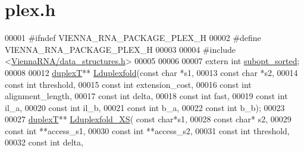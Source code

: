 \hypertarget{plex_8h_source}{}\section{plex.\+h}
\label{plex_8h_source}

\begin{DoxyCode}
00001 \textcolor{preprocessor}{#ifndef VIENNA\_RNA\_PACKAGE\_PLEX\_H}
00002 \textcolor{preprocessor}{#define VIENNA\_RNA\_PACKAGE\_PLEX\_H}
00003 
00004 \textcolor{preprocessor}{#include <\mbox{\hyperlink{data__structures_8h}{ViennaRNA/data\_structures.h}}>}
00005 
00006 
00007 \textcolor{keyword}{extern} \textcolor{keywordtype}{int} \mbox{\hyperlink{plex_8h_a873cf8ed69e0437f8efa8b1fec854a0e}{subopt\_sorted}};
00008 
00012 \mbox{\hyperlink{group__data__structures_structduplex_t}{duplexT}}** \mbox{\hyperlink{plex_8h_adf439821fe8201e071b56b8e12459762}{Lduplexfold}}(\textcolor{keyword}{const} \textcolor{keywordtype}{char} *s1,
00013                       \textcolor{keyword}{const} \textcolor{keywordtype}{char} *s2,
00014                       \textcolor{keyword}{const} \textcolor{keywordtype}{int} threshold,
00015                       \textcolor{keyword}{const} \textcolor{keywordtype}{int} extension\_cost,
00016                       \textcolor{keyword}{const} \textcolor{keywordtype}{int} alignment\_length,
00017                       \textcolor{keyword}{const} \textcolor{keywordtype}{int} delta,
00018                       \textcolor{keyword}{const} \textcolor{keywordtype}{int} fast,
00019                       \textcolor{keyword}{const} \textcolor{keywordtype}{int} il\_a,
00020                       \textcolor{keyword}{const} \textcolor{keywordtype}{int} il\_b,
00021                       \textcolor{keyword}{const} \textcolor{keywordtype}{int} b\_a,
00022                       \textcolor{keyword}{const} \textcolor{keywordtype}{int} b\_b);
00023 
00027 \mbox{\hyperlink{group__data__structures_structduplex_t}{duplexT}}** \mbox{\hyperlink{plex_8h_a7d6b8e940b04cf72a237b88b40a1ec2c}{Lduplexfold\_XS}}( \textcolor{keyword}{const} \textcolor{keywordtype}{char}*s1,
00028                           \textcolor{keyword}{const} \textcolor{keywordtype}{char}* s2,
00029                           \textcolor{keyword}{const} \textcolor{keywordtype}{int} **access\_s1,
00030                           \textcolor{keyword}{const} \textcolor{keywordtype}{int} **access\_s2,
00031                           \textcolor{keyword}{const} \textcolor{keywordtype}{int} threshold,
00032                           \textcolor{keyword}{const} \textcolor{keywordtype}{int} delta,

\end{DoxyCode}
